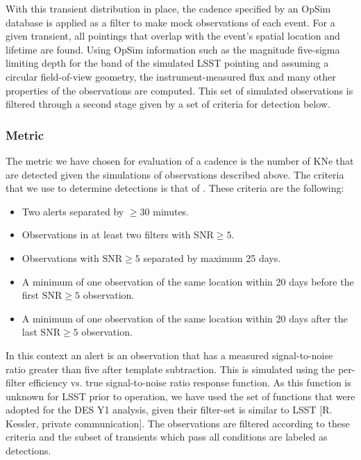With this transient distribution in place, the cadence specified by an OpSim database is applied as a filter to make mock observations of each event. For a given transient, all pointings that overlap with the event's spatial location and lifetime are found. Using OpSim information such as the magnitude five-sigma limiting depth for the band of the simulated LSST pointing and assuming a circular field-of-view geometry, the instrument-measured flux and many other properties of the observations are computed. This set of simulated observations is filtered through a second stage given by a set of criteria for detection below.

\subsubsection{Metric}
The metric we have chosen for evaluation of a cadence is the number of KNe that are detected given the simulations of observations described above. The criteria that we use to determine detections is that of \citet{Scolnic2017a}. These criteria are the following:
\begin{itemize}
  \item Two alerts separated by $\geq 30$ minutes.
  \item Observations in at least two filters with $\mathrm{SNR} \geq 5$.
  \item Observations with $\mathrm{SNR} \geq 5$ separated by maximum 25 days.
  \item A minimum of one observation of the same location within 20 days before the first $\mathrm{SNR} \geq 5$ observation.
  \item A minimum of one observation of the same location within 20 days after the last $\mathrm{SNR} \geq 5$ observation.
\end{itemize}

In this context an alert is an observation that has a measured signal-to-noise ratio greater than five after template subtraction. This is simulated using the per-filter efficiency vs. true signal-to-noise ratio response function. As this function is unknown for LSST prior to operation, we have used the set of functions that were adopted for the DES Y1 analysis, given their filter-set is similar to LSST [R. Kessler, private communication]. The observations are filtered according to these criteria and the subset of transients which pass all conditions are labeled as detections.

